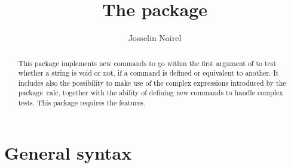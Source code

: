 \documentclass{article}
\title  {The \pack{xifthen} package}
\author {Josselin Noirel}
\newcommand*{\pack}{\textsf}
\begin{document}
\maketitle

\begin{abstract}
  This package implements new commands to go within the first argument of
   to test whether a string is void or not, if a command
  is defined or equivalent to another.  It includes also the possibility
  to make use of the complex expressions introduced by the
  package~\pack{calc}, together with the ability of defining new commands
  to handle complex tests.  This package requires the \eTeX{} features.
\end{abstract}

\section{General syntax}
\end{document}
